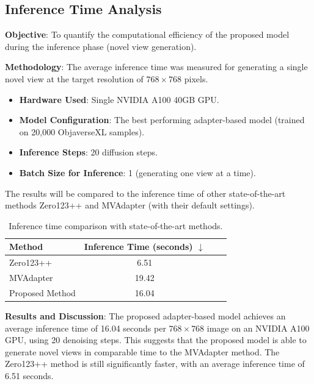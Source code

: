 \subsection{Inference Time Analysis}\label{ssec:exp_inference_time}
\textbf{Objective}: To quantify the computational efficiency of the proposed model during the inference phase (novel view generation).

\textbf{Methodology}:
The average inference time was measured for generating a single novel view at the target resolution of $768 \times 768$ pixels.
\begin{itemize}
  \item \textbf{Hardware Used}: Single NVIDIA A100 40GB GPU.
  \item \textbf{Model Configuration}: The best performing adapter-based model (trained on 20,000 ObjaverseXL samples).
  \item \textbf{Inference Steps}: 20 diffusion steps.
  \item \textbf{Batch Size for Inference}: 1 (generating one view at a time).
\end{itemize}

The results will be compared to the inference time of other state-of-the-art methods Zero123++ \cite{zero1to3} and MVAdapter \cite{mvadapter} (with their default settings).

\begin{table}[htbp]
  \centering
  \caption{Inference time comparison with state-of-the-art methods.}
  \label{tab:inference_time_comparison}
  \begin{tabular}{lccc}
    \toprule
    \textbf{Method} & \textbf{Inference Time (seconds)} $\downarrow$ \\
    \midrule
    Zero123++ \cite{zero1to3} & 6.51 \\
    MVAdapter \cite{mvadapter} & 19.42 \\
    Proposed Method & 16.04 \\
    \bottomrule
  \end{tabular}
\end{table}

\textbf{Results and Discussion}: The proposed adapter-based model achieves an average inference time of 16.04 seconds per $768 \times 768$ image on an NVIDIA A100 GPU, using 20 denoising steps. This suggests that the proposed model is able to generate novel views in comparable time to the MVAdapter method. The Zero123++ method is still significantly faster, with an average inference time of 6.51 seconds.

